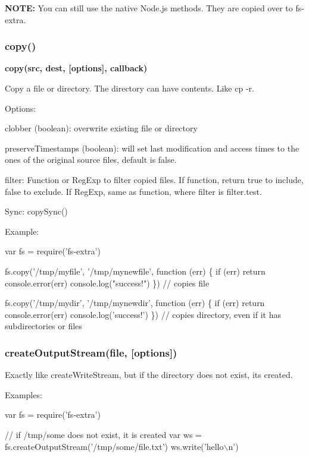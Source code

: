 {\bfseries N\+O\+TE\+:} You can still use the native Node.\+js methods. They are copied over to {\ttfamily fs-\/extra}.

\subsubsection*{copy()}

{\bfseries copy(src, dest, \mbox{[}options\mbox{]}, callback)}

Copy a file or directory. The directory can have contents. Like {\ttfamily cp -\/r}.

Options\+:
\begin{DoxyItemize}
\item clobber (boolean)\+: overwrite existing file or directory
\item preserve\+Timestamps (boolean)\+: will set last modification and access times to the ones of the original source files, default is {\ttfamily false}.
\item filter\+: Function or Reg\+Exp to filter copied files. If function, return true to include, false to exclude. If Reg\+Exp, same as function, where {\ttfamily filter} is {\ttfamily filter.\+test}.
\end{DoxyItemize}

Sync\+: {\ttfamily copy\+Sync()}

Example\+:


\begin{DoxyCode}
var fs = require('fs-extra')

fs.copy('/tmp/myfile', '/tmp/mynewfile', function (err) \{
  if (err) return console.error(err)
  console.log("success!")
\}) // copies file

fs.copy('/tmp/mydir', '/tmp/mynewdir', function (err) \{
  if (err) return console.error(err)
  console.log('success!')
\}) // copies directory, even if it has subdirectories or files
\end{DoxyCode}


\subsubsection*{create\+Output\+Stream(file, \mbox{[}options\mbox{]})}

Exactly like {\ttfamily create\+Write\+Stream}, but if the directory does not exist, it\textquotesingle{}s created.

Examples\+:


\begin{DoxyCode}
var fs = require('fs-extra')

// if /tmp/some does not exist, it is created
var ws = fs.createOutputStream('/tmp/some/file.txt')
ws.write('hello\(\backslash\)n')
\end{DoxyCode}


